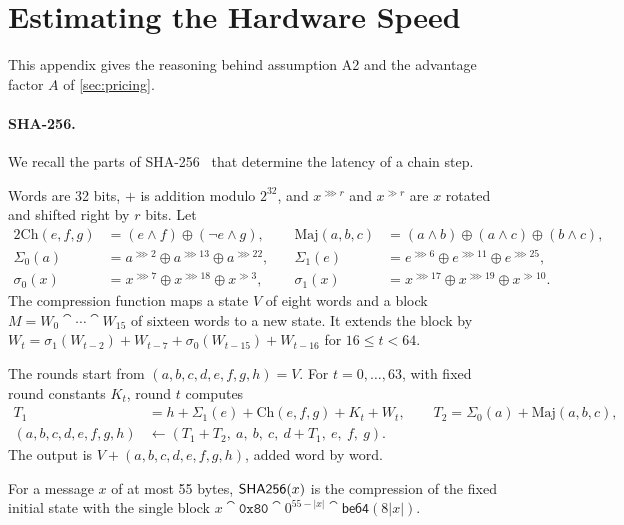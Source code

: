 \section{Estimating the Hardware Speed}\label{app:hardware}

This appendix gives the reasoning behind assumption A2 and the advantage factor $A$ of \cref{sec:pricing}.

\paragraph{SHA-256.}
We recall the parts of SHA-256~\cite{FIPS180-4} that determine the latency of a chain step.

\begin{definition}\label{def:sha}
Words are 32 bits, $+$ is addition modulo $2^{32}$, and $x^{\ggg r}$ and $x^{\gg r}$ are $x$ rotated and shifted right by $r$ bits. Let
\begin{alignat*}{2}
  \mathrm{Ch}(e,f,g) &= (e \wedge f) \oplus (\neg e \wedge g), &\quad
  \mathrm{Maj}(a,b,c) &= (a \wedge b) \oplus (a \wedge c) \oplus (b \wedge c),\\
  \Sigma_0(a) &= a^{\ggg 2} \oplus a^{\ggg 13} \oplus a^{\ggg 22}, &\quad
  \Sigma_1(e) &= e^{\ggg 6} \oplus e^{\ggg 11} \oplus e^{\ggg 25},\\
  \sigma_0(x) &= x^{\ggg 7} \oplus x^{\ggg 18} \oplus x^{\gg 3}, &\quad
  \sigma_1(x) &= x^{\ggg 17} \oplus x^{\ggg 19} \oplus x^{\gg 10}.
\end{alignat*}
The compression function maps a state $V$ of eight words and a block $M = W_0 \cat \cdots \cat W_{15}$ of sixteen words to a new state. It extends the block by $W_t = \sigma_1(W_{t-2}) + W_{t-7} + \sigma_0(W_{t-15}) + W_{t-16}$ for $16 \le t < 64$.

The rounds start from $(a,b,c,d,e,f,g,h) = V$. For $t = 0, \ldots, 63$, with fixed round constants $K_t$, round $t$ computes
\begin{align*}
  T_1 &= h + \Sigma_1(e) + \mathrm{Ch}(e,f,g) + K_t + W_t, \qquad T_2 = \Sigma_0(a) + \mathrm{Maj}(a,b,c),\\
  (a,b,c,d,e,f,g,h) &\gets (T_1 + T_2,\ a,\ b,\ c,\ d + T_1,\ e,\ f,\ g).
\end{align*}
The output is $V + (a,b,c,d,e,f,g,h)$, added word by word.

For a message $x$ of at most 55 bytes, $\mathsf{SHA256}(x)$ is the compression of the fixed initial state with the single block $x \cat \mathtt{0x80} \cat 0^{55-|x|} \cat \mathsf{be64}(8|x|)$.
\end{definition}

